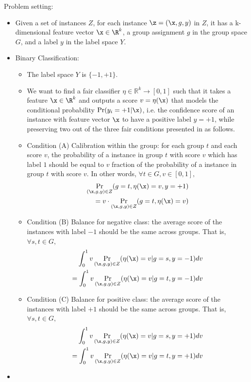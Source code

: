 \item Problem setting:
  \begin{itemize}
    \item Given a set of instances $Z$, for each instance $\z = (\x, g, y)$ in $Z$, it has a k-dimensional feature vector $\x \in \R^k$, a group assignment $g$ in the group space $G$, and a label $y$ in the label space $Y$.
    \item Binary Classification:
        \begin{itemize}
            \item The label space $Y$ is $\{-1, +1\}$.
            \item We want to find a fair classifier $\eta \in \mathbb{R}^k \rightarrow [0, 1]$ such that it takes a feature $\x \in \R^k$ and outputs a score $v = \eta(\x)$ that models the conditional probability $\Pr(y_i = +1 | \x)$, i.e. the confidence score of an instance with feature vector $\x$ to have a positive label $y = +1$, while preserving two out of the three fair conditions presented in \cite{kleinberg2016inherent} as follows.
            \item Condition (A) Calibration within the group: for each group $t$ and each score $v$, the probability of a instance in group $t$ with score $v$ which has label $1$ should be equal to $v$ fraction of the probability of a instance in group $t$ with score $v$. In other words, $ \forall t \in G, v \in [0, 1],$
            \begin{align*}
                \Pr_{(\x, g, y) \in Z}(g = t, \eta(\x) = v, y = +1) \\
                = v \cdot \Pr_{(\x, g, y) \in Z}(g = t, \eta(\x) = v)
            \end{align*}
            \item Condition (B) Balance for negative class: the average score of the instances with label $-1$ should be the same across groups. That is, $\forall s, t \in G,$
            \begin{align*}
                \int_{0}^{1} v \Pr_{(\x, g, y) \in Z}(\eta(\x) = v| g = s, y = -1) dv \\
                = \int_{0}^{1} v \Pr_{(\x, g, y) \in Z}(\eta(\x) = v| g = t, y = -1) dv
            \end{align*}
            \item Condition (C) Balance for positive class: the average score of the instances with label $+1$ should be the same across groups. That is, $\forall s, t \in G,$
            \begin{align*}
                \int_{0}^{1} v \Pr_{(\x, g, y) \in Z}(\eta(\x) = v| g = s, y = +1) dv \\
                = \int_{0}^{1} v \Pr_{(\x, g, y) \in Z}(\eta(\x) = v| g = t, y = +1) dv
            \end{align*}
        \end{itemize}
    \item 
  \end{itemize}